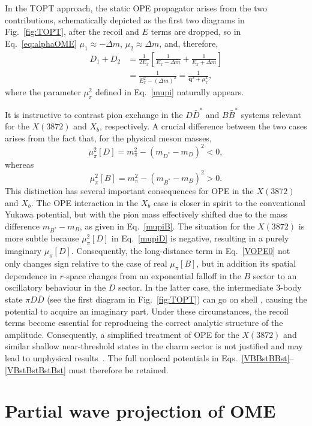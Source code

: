 \documentclass[aps,prd,showpacs,amsmath,twocolumn,superscriptaddress,floatfix,nofootinbib,notitlepage]{revtex4-2}
\newcommand{\veq}{{\bm q}}
\newcommand{\be}{\begin{equation}}
\newcommand{\ee}{\end{equation}}
\newcommand{\X}{X(3872)}
\newcommand{\Xb}{X_b}
\begin{document}
In the TOPT approach, the static OPE propagator arises from 
the two contributions, schematically depicted as the first two diagrams in Fig.~\ref{fig:TOPT}, after the recoil and $E$ terms are dropped, so
in Eq.~\eqref{eq:alphaOME} $\mu_1\approx-\Delta m$, $\mu_2\approx\Delta m$, and, therefore,
\be
\begin{split}
D_1+D_2&=
\frac{1}{2E_\pi}\left[\frac{1}{E_\pi-\Delta m}+\frac{1}{E_\pi+\Delta m}\right]\\
&=\frac{1}{E_\pi^2-(\Delta m)^2}=\frac{1}{\veq^2+\mu_\pi^2},
\end{split}
\ee
where the parameter $\mu_\pi^2$ defined in Eq.~\eqref{mupi} naturally appears.

It is instructive to contrast pion exchange in the $D\bar{D}^*$ and $B\bar{B}^*$ systems relevant for the $\X$ and $\Xb$, respectively. A crucial difference between the two cases arises from the fact that, for the physical meson masses,
\be
\mu_\pi^2[D]=m_\pi^2-(m_{D^*}-m_D)^2<0,
\label{mupiD}
\ee
whereas
\be
\mu_\pi^2[B]=m_\pi^2-(m_{B^*}-m_B)^2>0.
\label{mupiB}
\ee
This distinction has several important consequences for OPE in the $\X$ and $\Xb$. The OPE interaction in the $\Xb$ case is closer in spirit to the conventional Yukawa potential, but with the pion mass effectively shifted due to the mass difference $m_{B^*}-m_B$, as given in Eq.~\eqref{mupiB}. The situation for the $\X$ is more subtle because $\mu_\pi^2[D]$ in Eq.~\eqref{mupiD} is negative, resulting in a purely imaginary $\mu_\pi[D]$. Consequently, the long-distance term in Eq.~\eqref{VOPE0} not only changes sign relative to the case of real $\mu_\pi[B]$, but in addition its spatial dependence in $r$-space changes from an exponential falloff in the $B$ sector to an oscillatory behaviour in the $D$ sector.
In the latter case, the intermediate 3-body state $\pi D\bar{D}$ (see the first diagram in Fig.~\ref{fig:TOPT}) can go on shell \cite{Suzuki:2005ha}, causing the potential to acquire an imaginary part. Under these circumstances, the recoil terms become essential for reproducing the correct analytic structure of the amplitude. Consequently, a simplified treatment of OPE for the $\X$ and similar shallow near-threshold states in the charm sector is not justified and may lead to unphysical results~\cite{Baru:2011rs,Du:2021zzh}. The full nonlocal potentials in Eqs.~\eqref{VBBstBBst}--\eqref{VBstBstBstBst} must therefore be retained.

\section{Partial wave projection of OME}
\label{app:PWA}
\end{document}

